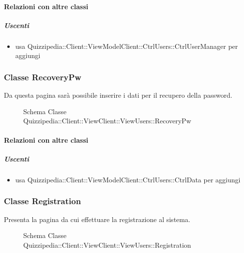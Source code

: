 \paragraph{Relazioni con altre classi}
\subparagraph{Uscenti}
\begin{itemize}
\item usa Quizzipedia::Client::ViewModelClient::CtrlUsers::CtrlUserManager per aggiungi
\end{itemize}
\subsubsection{Classe RecoveryPw}
Da questa pagina sarà possibile inserire i dati per il recupero della password.
\begin{figure}[H]
\centering
\noindent{}
\caption[Schema Classe RecoveryPw]{Schema Classe Quizzipedia::Client::ViewClient::ViewUsers::RecoveryPw}
\end{figure}
\paragraph{Relazioni con altre classi}
\subparagraph{Uscenti}
\begin{itemize}
\item usa Quizzipedia::Client::ViewModelClient::CtrlUsers::CtrlData per aggiungi
\end{itemize}
\subsubsection{Classe Registration}
Presenta la pagina da cui effettuare la  registrazione al sistema.
\begin{figure}[H]
\centering
\noindent{}
\caption[Schema Classe Registration]{Schema Classe Quizzipedia::Client::ViewClient::ViewUsers::Registration}
\end{figure}
